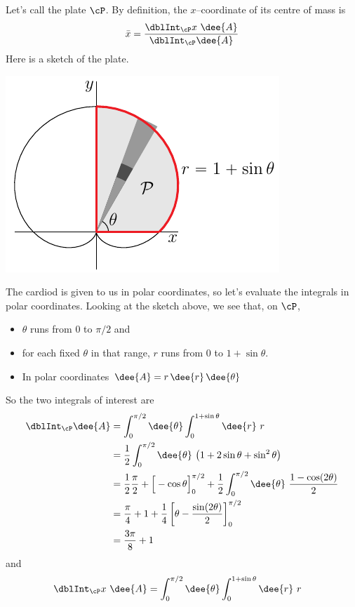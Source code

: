 \begin{solution}
Let's call the plate $\cP$. By definition, the $x$--coordinate of its 
centre of mass is
\begin{align*}
\bar x = \frac{\dblInt_\cP x\ \dee{A}}{\dblInt_\cP\dee{A}}
\end{align*}
Here is a sketch of the plate.
\begin{center}
     \includegraphics{fig/OE09D_7.pdf}
\end{center}
The cardiod is given to us in polar coordinates, so let's evaluate the
integrals in polar coordinates. Looking at the sketch above, we see that,
on $\cP$,
\begin{itemize}
\item
$\theta$ runs from $0$ to $\pi/2$ and
\item
for each fixed $\theta$ in that range, $r$ runs from $0$
to $1+\sin\theta$.
\item
In polar coordinates $\dee{A} = r\,\dee{r}\,\dee{\theta}$
\end{itemize}
So the two integrals of interest are
\begin{align*}
\dblInt_\cP\dee{A}
&=\int_0^{\pi/2}\dee{\theta}\int_0^{1+\sin\theta}\dee{r}\ r \\
&=\frac{1}{2} \int_0^{\pi/2}\dee{\theta}\ \big(1+2\sin\theta +\sin^2\theta\big)\\
&=\frac{1}{2}\frac{\pi}{2} +\Big[-\cos\theta\Big]_0^{\pi/2}
+\frac{1}{2} \int_0^{\pi/2}\dee{\theta}\ \frac{1-\cos(2\theta)}{2} \\
&=\frac{\pi}{4} + 1 
    +\frac{1}{4}\left[\theta-\frac{\sin(2\theta)}{2}\right]_0^{\pi/2} \\
&=\frac{3\pi}{8} + 1
\end{align*}
and
\begin{align*}
\dblInt_\cP x\ \dee{A}
&=\int_0^{\pi/2}\dee{\theta}\int_0^{1+\sin\theta}\dee{r}\ r

\end{align*}
\end{solution}

